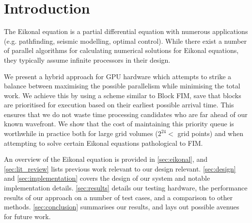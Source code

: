 \documentclass[11pt]{article}       %
\begin{document}
\section{Introduction} \label{sec:intro}

The Eikonal equation is a partial differential equation with numerous applications (e.g. pathfinding, seismic modelling, optimal control). While there exist a number of parallel algorithms for calculating numerical solutions for Eikonal equations, they typically assume infinite processors in their design.

We present a hybrid approach for GPU hardware which attempts to strike a balance between maximising the possible parallelism while minimising the total work. We achieve this by using a scheme similar to Block FIM\cite{jeong2008fast}, save that blocks are prioritised for execution based on their earliest possible arrival time. This ensures that we do not waste time processing candidates who are far ahead of our known wavefront. We show that the cost of maintaining this priority queue is worthwhile in practice both for large grid volumes ($2^{24} < $ grid points) and when attempting to solve certain Eikonal equations pathological to FIM.

An overview of the Eikonal equation is provided in \autoref{sec:eikonal}, and \autoref{sec:lit_review} lists previous work relevant to our design relevant.
\autoref{sec:design} and \autoref{sec:implementation} covers the design of our system and notable implementation details. \autoref{sec:results} details our testing hardware, the performance results of our approach on a number of test cases, and a comparison to other methods. \autoref{sec:conclusion} summarises our results, and lays out possible avenues for future work.

\end{document}

